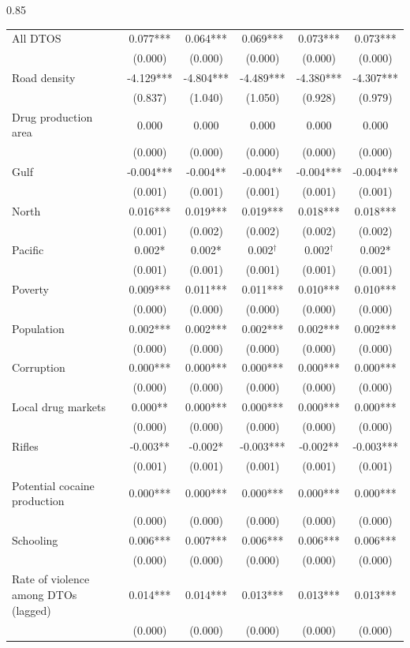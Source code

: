 \documentclass[12pt,letterpaper]{article}
\begin{document}
\begin{landscape}
\begin{center}
\begin{spacing}{0.85}
\begin{longtable}{lccccc}
                
All DTOS & 0.077*** & 0.064*** & 0.069*** & 0.073*** & 0.073*** \\
 & (0.000)  & (0.000)  & (0.000)  & (0.000)  & (0.000)  \\
                
Road density & -4.129*** & -4.804*** & -4.489*** & -4.380*** & -4.307*** \\
 & (0.837)  & (1.040)  & (1.050)  & (0.928)  & (0.979)  \\

Drug production area & 0.000  & 0.000  & 0.000  & 0.000  & 0.000  \\
 & (0.000)  & (0.000)  & (0.000)  & (0.000)  & (0.000)  \\
Gulf & -0.004*** & -0.004** & -0.004** & -0.004*** & -0.004*** \\
 & (0.001)  & (0.001)  & (0.001)  & (0.001)  & (0.001)  \\
North & 0.016*** & 0.019*** & 0.019*** & 0.018*** & 0.018*** \\
 & (0.001)  & (0.002)  & (0.002)  & (0.002)  & (0.002)  \\
Pacific & 0.002* & 0.002* & 0.002$^{\dag}$& 0.002$^{\dag}$& 0.002* \\
 & (0.001)  & (0.001)  & (0.001)  & (0.001)  & (0.001)  \\
Poverty & 0.009*** & 0.011*** & 0.011*** & 0.010*** & 0.010*** \\
 & (0.000)  & (0.000)  & (0.000)  & (0.000)  & (0.000)  \\
Population & 0.002*** & 0.002*** & 0.002*** & 0.002*** & 0.002*** \\
 & (0.000)  & (0.000)  & (0.000)  & (0.000)  & (0.000)  \\
Corruption & 0.000*** & 0.000*** & 0.000*** & 0.000*** & 0.000*** \\
 & (0.000)  & (0.000)  & (0.000)  & (0.000)  & (0.000)  \\
Local drug markets & 0.000** & 0.000*** & 0.000*** & 0.000*** & 0.000*** \\
 & (0.000)  & (0.000)  & (0.000)  & (0.000)  & (0.000)  \\
Rifles & -0.003** & -0.002* & -0.003*** & -0.002** & -0.003*** \\
 & (0.001)  & (0.001)  & (0.001)  & (0.001)  & (0.001)  \\
                
Potential cocaine production & 0.000*** & 0.000*** & 0.000*** & 0.000*** & 0.000*** \\
 & (0.000)  & (0.000)  & (0.000)  & (0.000)  & (0.000)  \\
Schooling & 0.006*** & 0.007*** & 0.006*** & 0.006*** & 0.006*** \\
 & (0.000)  & (0.000)  & (0.000)  & (0.000)  & (0.000)  \\
Rate of violence among DTOs (lagged) & 0.014*** & 0.014*** & 0.013*** & 0.013*** & 0.013*** \\
 & (0.000)  & (0.000)  & (0.000)  & (0.000)  & (0.000)  \\
                

\end{longtable}
\end{spacing}
\end{center}
\end{landscape}
\end{document}
